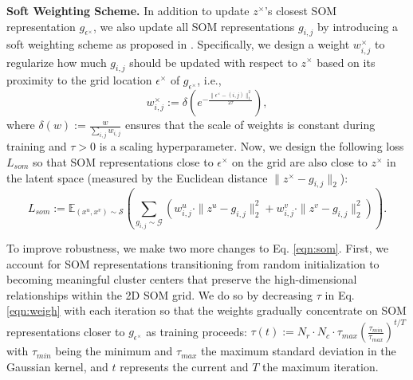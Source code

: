 \documentclass[runningheads]{llncs}
\begin{document}
\textbf{Soft Weighting Scheme.} In addition to update $z^\times$'s closest SOM representation $g_{\epsilon^\times}$, we also update all SOM representations $g_{i,j}$ by introducing a soft weighting scheme as proposed in \cite{mulyadi2022xadlime}. Specifically, we design a weight $w^\times_{i,j}$ to regularize how much $g_{i,j}$ should be updated with respect to $z^\times$ based on its proximity to the grid location $\epsilon^\times$ of $g_{\epsilon^\times}$, i.e., 
\begin{equation}
w_{i,j}^\times := \delta \left( e^{-\frac{\parallel \epsilon^\times - (i,j)\parallel_1^2}{2\tau}}\right), 
\label{eqn:weigh}
\end{equation}
where $\delta(w):=\frac{w}{\sum_{i,j} w_{i,j}}$  ensures that the scale of weights is constant during training and $\tau >0$ is a scaling hyperparameter. Now, we design the following loss $L_{som}$ so that SOM representations close to $\epsilon^\times$ on the grid are also close to $z^\times$ in the latent space (measured by the Euclidean distance $\parallel z^\times - g_{i,j} \parallel_2$):
\begin{equation}
L_{som} := \mathbb{E}_{(x^u, x^v) \sim \mathcal{S}} \left(\sum_{g_{i, j} \sim \mathcal{G}}\left( w^u_{i,j} \cdot \parallel z^u - g_{i,j} \parallel_2^2 + w^v_{i,j} \cdot \parallel z^v - g_{i,j} \parallel_2^2 \right)\right).
\label{eqn:som}
\end{equation}



To improve robustness, we make two more changes to Eq. \ref{eqn:som}. First, we account for SOM representations transitioning from random initialization to becoming meaningful cluster centers that preserve the high-dimensional relationships within the 2D SOM grid. We do so by decreasing $\tau$ in Eq. \ref{eqn:weigh} with each iteration so that the weights gradually concentrate on SOM representations closer to $g_{\epsilon^\times}$ as training proceeds: $\tau(t) := N_r \cdot N_c \cdot \tau_{max} \left( \frac{\tau_{min}}{\tau_{max}} \right)^{t/T} $
with $\tau_{min}$ being the minimum and $\tau_{max}$ the maximum standard deviation in the Gaussian kernel, and $t$ represents the current and $T$ the maximum iteration. 
\end{document}
